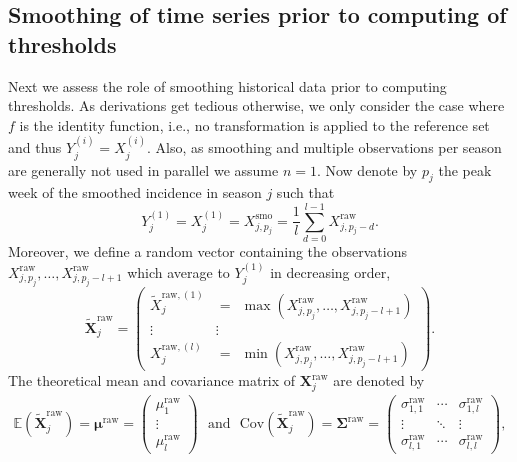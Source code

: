 \documentclass{article}
\begin{document}
\subsection{Smoothing of time series prior to computing of thresholds}
\label{subsec:smoothing}

Next we assess the role of smoothing historical data prior to computing thresholds. As derivations get tedious otherwise, we only consider the case where $f$ is the identity function, i.e., no transformation is applied to the reference set and thus $
Y^{(i)}_j = X^{(i)}_j$. Also, as smoothing and multiple observations per season are generally not used in parallel we assume $n = 1$. Now denote by $p_j$ the peak week of the smoothed incidence in season $j$ such that
\begin{equation}
Y_j^{(1)} =  X_j^{(1)} = X^{\text{smo}}_{j, p_j} = \frac{1}{l} \sum_{d = 0}^{l - 1} X^{\text{raw}}_{j, p_j - d}.\label{eq:Y_1_smoothing}
\end{equation}
Moreover, we define a random vector containing the observations $X^{\text{raw}}_{j, p_j}, \dots, X^{\text{raw}}_{j, p_j - l + 1}$ which average to $Y_j^{(1)}$ in decreasing order,
$$
\tilde{\mathbf{X}}^\text{raw}_j = \begin{pmatrix} \tilde{X}_j^{\text{raw}, (1)} & = \ \ \max(X^{\text{raw}}_{j, p_j}, \dots, X^{\text{raw}}_{j, p_j - l + 1}) \\ \vdots & \vdots \\ X_j^{\text{raw}, (l)} & = \ \ \min(X^{\text{raw}}_{j, p_j}, \dots, X^{\text{raw}}_{j, p_j - l + 1}) \end{pmatrix}.
$$
The theoretical mean and covariance matrix of $\mathbf{X}^\text{raw}_j$ are denoted by
\begin{align}
\mathbb{E}\left(\tilde{\mathbf{X}}^\text{raw}_j\right) = \boldsymbol{\mu}^\text{raw} = \left(\begin{array}{c}
\mu^\text{raw}_1\\
\vdots\\
\mu^\text{raw}_l
\end{array}\right) \ \ \ \text{and} \ \ \ \text{Cov}\left(\tilde{\mathbf{X}}^\text{raw}_j\right) = \boldsymbol{\Sigma}^\text{raw} =
\left(\begin{array}{ccc}
\sigma^\text{raw}_{1, 1} & \cdots & \sigma^\text{raw}_{1, l}\\
\vdots & \ddots &\vdots\\
\sigma^\text{raw}_{l, 1} & \cdots & \sigma^\text{raw}_{l, l}
\end{array}\right),
\end{align}
\end{document}
